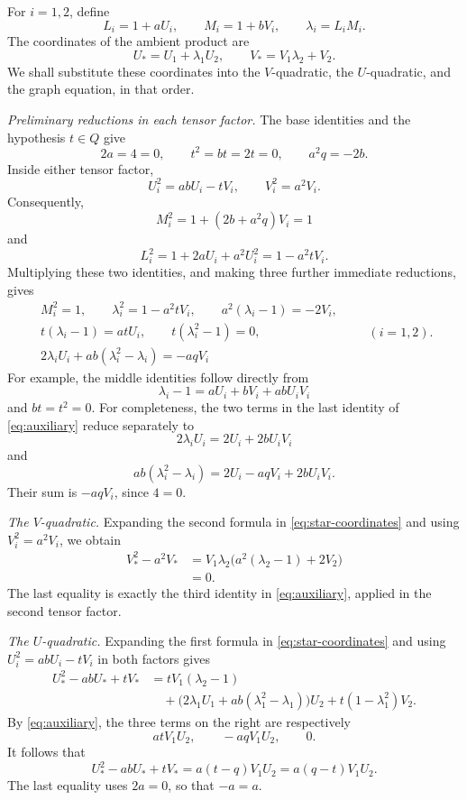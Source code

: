 \documentclass[11pt]{amsart}
\theoremstyle{remark}
\begin{document}
For \(i=1,2\), define
\begin{equation}\label{eq:tensor-characters}
 L_i=1+aU_i,\qquad
 M_i=1+bV_i,\qquad
 \lambda_i=L_iM_i.
\end{equation}
The coordinates of the ambient product are
\begin{equation}\label{eq:star-coordinates}
 U_*=U_1+\lambda_1U_2,
 \qquad
 V_*=V_1\lambda_2+V_2.
\end{equation}
We shall substitute these coordinates into the \(V\)-quadratic, the
\(U\)-quadratic, and the graph equation, in that order.

\smallskip
\noindent\emph{Preliminary reductions in each tensor factor.}
The base identities and the hypothesis \(t\in Q\) give
\[
 2a=4=0,\qquad
 t^2=bt=2t=0,\qquad
 a^2q=-2b.
\]
Inside either tensor factor,
\[
 U_i^2=abU_i-tV_i,
 \qquad
 V_i^2=a^2V_i.
\]
Consequently,
\[
 M_i^2
 =1+(2b+a^2q)V_i
 =1
\]
and
\[
 L_i^2
 =1+2aU_i+a^2U_i^2
 =1-a^2tV_i.
\]
Multiplying these two identities, and making three further immediate
reductions, gives
\begin{equation}\label{eq:auxiliary}
\begin{gathered}
 M_i^2=1,\qquad
 \lambda_i^2=1-a^2tV_i,\qquad
 a^2(\lambda_i-1)=-2V_i,\\
 t(\lambda_i-1)=atU_i,\qquad
 t(\lambda_i^2-1)=0,\\
 2\lambda_iU_i
   +ab(\lambda_i^2-\lambda_i)
   =-aqV_i
\end{gathered}
\qquad (i=1,2).
\end{equation}
For example, the middle identities follow directly from
\[
 \lambda_i-1=aU_i+bV_i+abU_iV_i
\]
and \(bt=t^2=0\).  For completeness, the two terms in the last
identity of \eqref{eq:auxiliary} reduce separately to
\[
 2\lambda_iU_i=2U_i+2bU_iV_i
\]
and
\[
 ab(\lambda_i^2-\lambda_i)
   =2U_i-aqV_i+2bU_iV_i.
\]
Their sum is \(-aqV_i\), since \(4=0\).

\smallskip
\noindent\emph{The \(V\)-quadratic.}
Expanding the second formula in \eqref{eq:star-coordinates} and using
\(V_i^2=a^2V_i\), we obtain
\begin{align*}
 V_*^2-a^2V_*
 &=V_1\lambda_2
   \bigl(a^2(\lambda_2-1)+2V_2\bigr)\\
 &=0.
\end{align*}
The last equality is exactly the third identity in
\eqref{eq:auxiliary}, applied in the second tensor factor.

\smallskip
\noindent\emph{The \(U\)-quadratic.}
Expanding the first formula in \eqref{eq:star-coordinates} and using
\(U_i^2=abU_i-tV_i\) in both factors gives
\begin{align*}
 U_*^2-abU_*+tV_*
 &=tV_1(\lambda_2-1)\\
 &\quad+
 \bigl(
  2\lambda_1U_1
  +ab(\lambda_1^2-\lambda_1)
 \bigr)U_2
 +t(1-\lambda_1^2)V_2.
\end{align*}
By \eqref{eq:auxiliary}, the three terms on the right are respectively
\[
 atV_1U_2,\qquad
 -aqV_1U_2,\qquad
 0.
\]
It follows that
\[
 U_*^2-abU_*+tV_*
 =a(t-q)V_1U_2
 =a(q-t)V_1U_2.
\]
The last equality uses \(2a=0\), so that \(-a=a\).
\end{document}
